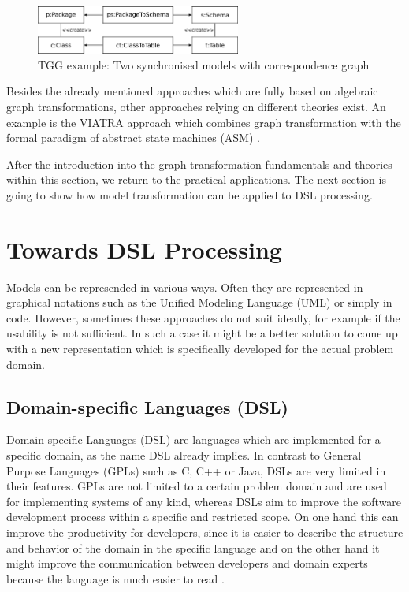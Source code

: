\documentclass[runningheads]{llncs}
\begin{document}
\begin{figure}[H]
	\centering
	\includegraphics[width=0.6\textwidth]{tgg-example}
	\caption{TGG example: Two synchronised models with correspondence graph \cite{DBLP:phd/de/Konigs2009}}
	\label{fig:tgg-example}
\end{figure}

\noindent
Besides the already mentioned approaches which are fully based on algebraic graph transformations, other approaches relying on different theories exist. An example is the VIATRA \cite{viatra} approach which combines graph transformation with the formal paradigm of abstract state machines (ASM) \cite{Borger:2003:ASM:829603}.

After the introduction into the graph transformation fundamentals and theories within this section, we return to the practical applications. The next section is going to show how model transformation can be applied to DSL processing.

\section{Towards DSL Processing}\label{dsl-processing}
Models can be represended in various ways. Often they are represented in graphical notations such as the Unified Modeling Language (UML) or simply in code. However, sometimes these approaches do not suit ideally, for example if the usability is not sufficient. In such a case it might be a better solution to come up with a new representation which is specifically developed for the actual problem domain.

\subsection{Domain-specific Languages (DSL)}
Domain-specific Languages (DSL) are languages which are implemented for a specific domain, as the name DSL already implies. In contrast to General Purpose Languages (GPLs) such as C, C++ or Java, DSLs are very limited in their features. GPLs are not limited to a certain problem domain and are used for implementing systems of any kind, whereas DSLs aim to improve the software development process within a specific and restricted scope. On one hand this can improve the productivity for developers, since it is easier to describe the structure and behavior of the domain in the specific language and on the other hand it might improve the communication between developers and domain experts because the language is much easier to read \cite{Fowler:2010:DSL:1809745}.
\end{document}
